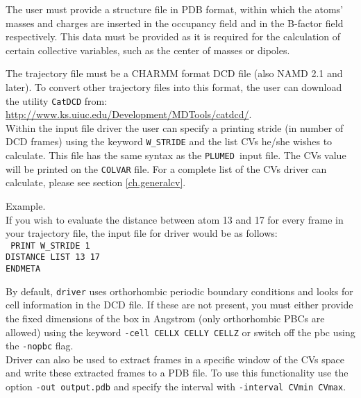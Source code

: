\documentclass[12pt,fleqn]{report}
\newcommand{\plumed}{{\tt PLUMED}}
\newcommand{\esempio}[1]{
\vspace{10pt}
\begin{flushright}
\colorbox{light-gray}{
   \begin{minipage}{13cm}
       \scriptsize{
{\fontfamily{phv} \fontseries{b}
 \selectfont Example. \\
 \fontseries{m} \selectfont #1 } }
\end{minipage}}
\end{flushright}
\vspace{20pt}
}
\begin{document}
The user must provide a structure file in PDB format, within which the 
 atoms' masses and charges are inserted in the 
occupancy field and in the B-factor field respectively.
This data must be provided as it is required for the calculation of certain collective variables, such as
the center of masses or dipoles.

The trajectory file must be a CHARMM format DCD file (also NAMD 2.1 and later). 
To convert other trajectory files into this format, the user can download the utility {\tt CatDCD} from: \\ \url{http://www.ks.uiuc.edu/Development/MDTools/catdcd/}.\\

Within the input file driver the user can specify a printing stride (in number of DCD frames) using
the keyword {\tt W\_STRIDE} and the list CVs he/she wishes to calculate.  This file has the same syntax as the \plumed \ input file.
The CVs value will be printed on the {\tt COLVAR} file.
For a complete list of the CVs driver can calculate, please see section \ref{ch.generalcv}.

\esempio{If you wish to evaluate the distance between atom 13 and 17
for every frame in your trajectory file, the input file for driver would be as follows:
 \vspace{10pt} \\ 
{\tt
PRINT W\_STRIDE 1\\
DISTANCE LIST 13 17\\
ENDMETA
}}

By default, {\tt driver} uses orthorhombic periodic boundary conditions and looks for cell information in the DCD file. 
If these are not present, you must either provide the fixed dimensions of the box in Angstrom (only orthorhombic PBCs are allowed)
using the keyword {\tt -cell CELLX CELLY CELLZ} or switch off the pbc using the {\tt -nopbc} flag.
\\
Driver can also be used to extract frames in a specific window of the CVs space and write these extracted frames to a PDB file.
To use this functionality use the option {\tt -out output.pdb} and specify the interval with {\tt -interval CVmin CVmax}.
\end{document}
